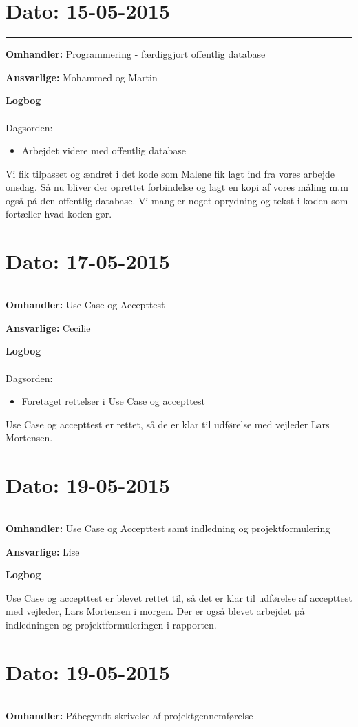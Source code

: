 \section{Dato: 15-05-2015}
\hrule
\textbf{Omhandler:} Programmering - færdiggjort offentlig database

\textbf{Ansvarlige:} Mohammed og Martin

\textbf{Logbog}
\\
\\
Dagsorden:
\begin{itemize}
	\item Arbejdet videre med offentlig database
\end{itemize}

Vi fik tilpasset og ændret i det kode som Malene fik lagt ind fra vores arbejde onsdag. Så nu bliver der oprettet forbindelse og lagt en kopi af vores måling m.m også på den offentlig database. Vi mangler noget oprydning og tekst i koden som fortæller hvad koden gør.

\section{Dato: 17-05-2015}
\hrule
\textbf{Omhandler:} Use Case og Accepttest

\textbf{Ansvarlige:} Cecilie

\textbf{Logbog}
\\
\\
Dagsorden:
\begin{itemize}
	\item Foretaget rettelser i Use Case og accepttest
\end{itemize}

Use Case og accepttest er rettet, så de er klar til udførelse med vejleder Lars Mortensen.

\section{Dato: 19-05-2015}
\hrule
\textbf{Omhandler:} Use Case og Accepttest samt indledning og projektformulering

\textbf{Ansvarlige:} Lise 

\textbf{Logbog}

Use Case og accepttest er blevet rettet til, så det er klar til udførelse af accepttest med vejleder, Lars Mortensen i morgen. Der er også blevet arbejdet på indledningen og projektformuleringen i rapporten. 

\section{Dato: 19-05-2015}
\hrule
\textbf{Omhandler:} Påbegyndt skrivelse af projektgennemførelse

